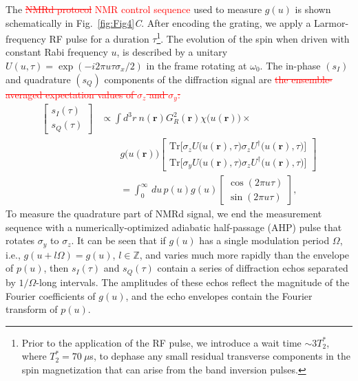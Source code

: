 \documentclass[9pt,twocolumn,twoside,lineno]{pnas-new}
\newcommand{\RB}[3][{}]{\textcolor{red}{\sout{#2} #3\ul{#1}}}
\begin{document}
The \RB{NMRd protocol}{NMR control sequence} used to measure $g(u)$ is shown schematically in Fig.~\ref{fig:Fig4}\textit{C}.
After encoding the grating, we apply a Larmor-frequency RF pulse for a duration $\tau$\footnote{Prior to the application of the RF pulse, we introduce a wait time $\sim 3 T_2^*$, where $T_2^* = 70 \ \mu$s, to dephase any small residual transverse components in the spin magnetization that can arise from the band inversion pulses.}.
The evolution of the spin when driven with constant Rabi frequency $u$, is described by a unitary $U(u,\tau)=\exp(-i2\pi u \tau\sigma_x/2)$ in the frame rotating at $\omega_0$.
The in-phase $(s_I)$ and quadrature $(s_Q)$ components of the diffraction signal are \RB{the ensemble-averaged expectation values of $\sigma_z$ and $\sigma_y$:}{}
\begin{align}
    \nonumber \begin{bmatrix}
        s_I(\tau)\\
        s_Q(\tau)
    \end{bmatrix}&\propto \int d^3r~n(\mathbf{r})G_R^2(\mathbf{r})\chi\big(u(\mathbf{r})\big) \times \\
    &\qquad g\big(u(\mathbf{r})\big) \begin{bmatrix}
        \mathrm{Tr}\big[\sigma_z U\big(u(\mathbf{r}),\tau\big)\sigma_z U^{\dagger}\big(u(\mathbf{r}),\tau\big)\big] \\[5pt]
        \mathrm{Tr}\big[\sigma_y U\big(u(\mathbf{r}),\tau\big)\sigma_z U^{\dagger}\big(u(\mathbf{r}),\tau\big)\big]
    \end{bmatrix}\nonumber\\[3mm]
    &\qquad = \int_0^\infty\,du\,p(u) g(u)
    \begin{bmatrix}
        \cos(2\pi u\tau)\\
        \sin(2\pi u\tau)
    \end{bmatrix},
    \label{eq1}
\end{align}
To measure the quadrature part of NMRd signal, we end the measurement sequence with a numerically-optimized adiabatic half-passage (AHP) pulse \cite{tabatabaei2021} that rotates $\sigma_y$ to $\sigma_z$. It can be seen that if $g(u)$ has a single modulation period $\Omega$, i.e., $g(u+l\Omega)=g(u)$, $l\in\mathbb{Z}$, and varies much more rapidly than the envelope of $p(u)$, then $s_I(\tau)$ and
$s_Q(\tau)$ contain a series of diffraction echos separated by $1/\Omega$-long intervals. The amplitudes of these echos reflect the magnitude of the Fourier coefficients of $g(u)$, and the echo envelopes contain the Fourier transform of $p(u)$.
\end{document}
